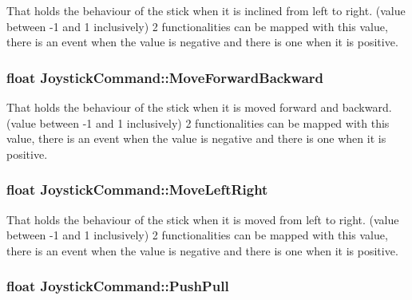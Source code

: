 That holds the behaviour of the stick when it is inclined from left to right. (value between -\/1 and 1 inclusively) 2 functionalities can be mapped with this value, there is an event when the value is negative and there is one when it is positive. 

\subsubsection[{\texorpdfstring{Move\+Forward\+Backward}{MoveForwardBackward}}]{\setlength{\rightskip}{0pt plus 5cm}float Joystick\+Command\+::\+Move\+Forward\+Backward}\hypertarget{struct_joystick_command_a9ca8ffe74ba1717de22528f71b0e5592}{}\label{struct_joystick_command_a9ca8ffe74ba1717de22528f71b0e5592}


That holds the behaviour of the stick when it is moved forward and backward. (value between -\/1 and 1 inclusively) 2 functionalities can be mapped with this value, there is an event when the value is negative and there is one when it is positive. 

\subsubsection[{\texorpdfstring{Move\+Left\+Right}{MoveLeftRight}}]{\setlength{\rightskip}{0pt plus 5cm}float Joystick\+Command\+::\+Move\+Left\+Right}\hypertarget{struct_joystick_command_a6ca311d7940ce3c7ea6e9a3719388181}{}\label{struct_joystick_command_a6ca311d7940ce3c7ea6e9a3719388181}


That holds the behaviour of the stick when it is moved from left to right. (value between -\/1 and 1 inclusively) 2 functionalities can be mapped with this value, there is an event when the value is negative and there is one when it is positive. 

\subsubsection[{\texorpdfstring{Push\+Pull}{PushPull}}]{\setlength{\rightskip}{0pt plus 5cm}float Joystick\+Command\+::\+Push\+Pull}\hypertarget{struct_joystick_command_af530128a7a89e383f88a4c2b798a66b4}{}\label{struct_joystick_command_af530128a7a89e383f88a4c2b798a66b4}


